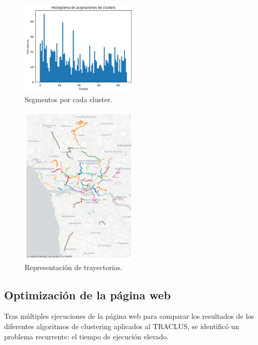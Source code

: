 \begin{enumerate}
\begin{figure}[h!]
    \centering
    \includegraphics[width=0.5\textwidth]{img/histograma_Spect.png}
    \caption{Segmentos por cada cluster.}
    \label{fig:histograma_Spectral}
\end{figure}

\begin{figure}[h!]
    \centering
    \includegraphics[width=0.5\textwidth]{img/r_tray_Spect.png}
    \caption{Representación de trayectorias.}
    \label{fig:trayectorias_Spectral}
\end{figure}

\FloatBarrier

\end{enumerate}

\subsection{Optimización de la página web} 

Tras múltiples ejecuciones de la página web para comparar los resultados de los diferentes algoritmos de clustering aplicados al TRACLUS, se identificó un problema recurrente: el tiempo de ejecución elevado.

